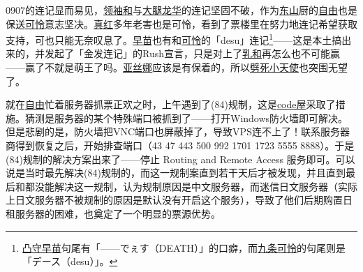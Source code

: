 
0907的连记显而易见，\uline{领袖和}与\uline{大腿龙华}的连记坚固不破，作为\uline{东山}厨的\uline{自由}也是保送\uline{可怜}意志坚决。\uline{真红}多年老害也是可怜，看到了票楼里在努力地连记希望获取支持，可也只能无奈叹息了。\uline{早苗}也有和\uline{可怜}的「desu」连记\footnote{\uline{凸守早苗}句尾有「——でぇす（DEATH）」的口癖，而\uline{九条可怜}的句尾则是「デース（desu）」。}——这是本土搞出来的，并发起了「金发连记」的Rush宣言，只是对上了\uline{乳和}再怎么也不可能赢——赢了不就是萌王了吗。\uline{亚丝娜}应该是有保着的，所以\uline{劈死小天使}也突围无望了。

就在\uline{自由}忙着服务器抓票正欢之时，上午遇到了(84)规制，这是\uline{code屋}采取了措施。猜测是服务器的某个特殊端口被抓到了——打开Windows防火墙即可解决。但是悲剧的是，防火墙把VNC端口也屏蔽掉了，导致VPS连不上了！联系服务器商得到恢复之后，开始排查端口（43 47 443 500 992 1701 1723 5555 8888）。于是(84)规制的解决方案出来了——停止 Routing and Remote Access 服务即可。可以说是当时最先解决(84)规制的，而这一规制案直到若干天后才被发现，并且直到最后和都没能解决这一规制，认为规制原因是中文服务器，而迷信日文服务器（实际上日文服务器不被规制的原因是默认没有开启这个服务），导致了他们后期购置日租服务器的困难，也奠定了一个明显的票源优势。

